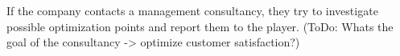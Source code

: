 If the company contacts a management consultancy, they try to investigate possible optimization points and report them to the player. (ToDo: Whats the goal of the consultancy -> optimize customer satisfaction?) 

